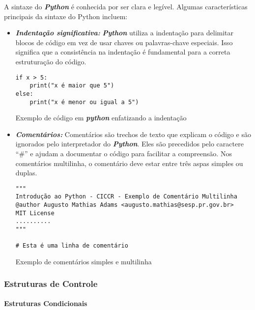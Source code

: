 \documentclass[a4paper, 12pt, onecolumn,singlespacing]{article}
\begin{document}
	A sintaxe do \textbf{\textit{Python}} é conhecida por ser clara e legível. Algumas características principais da sintaxe do Python incluem:
	\begin{itemize}
		\item \textbf{\textit{Indentação significativa:}} \textbf{\textit{Python}} utiliza a indentação para delimitar blocos de código em vez de usar chaves ou palavras-chave especiais. Isso significa que a consistência na indentação é fundamental para a correta estruturação do código.

\begin{listing}[!ht]
	\begin{verbatim}
if x > 5:
	print("x é maior que 5")
else:
	print("x é menor ou igual a 5")

	\end{verbatim}
	\label{exemplo_curto_identacao}
	\caption{Exemplo de código em \textbf{\textit{python}} enfatizando a indentação}
\end{listing}
	\item \textbf{\textit{Comentários:}} Comentários são trechos de texto que explicam o código e são ignorados pelo interpretador do \textit{\textbf{Python}}. Eles são precedidos pelo caractere ``\#'' e ajudam a documentar o código para facilitar a compreensão. Nos comentários multilinha, o comentário deve estar entre três aspas simples ou duplas.
	\begin{listing}
		\begin{verbatim}
"""
Introdução ao Python - CICCR - Exemplo de Comentário Multilinha
@author Augusto Mathias Adams <augusto.mathias@sesp.pr.gov.br>
MIT License
..........
"""

# Esta é uma linha de comentário

		\end{verbatim}
	\label{exemplo_curto_comentário}
	\caption{Exemplo de comentários simples e multilinha}
	\end{listing}
	\end{itemize}

	
	\subsubsection{Estruturas de Controle}
	
	\paragraph{Estruturas Condicionais}
	
\end{document}
